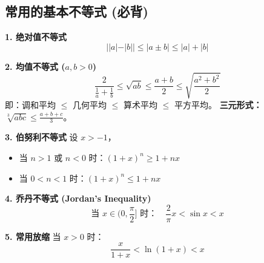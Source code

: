 \documentclass[a4paper,12pt]{ctexart}
\newenvironment{rednote}
  {\begin{tcolorbox}[colback=notepurple, colframe=highlightred, boxrule=1pt, title=\textbf{手写笔记/技巧补充}]}
  {\end{tcolorbox}}
\begin{document}
\subsection{常用的基本不等式 (必背)}

\begin{rednote}
\textbf{1. 绝对值不等式}
\[ ||a| - |b|| \le |a \pm b| \le |a| + |b| \]

\textbf{2. 均值不等式 ($a, b > 0$)}
\[ \frac{2}{\frac{1}{a} + \frac{1}{b}} \le \sqrt{ab} \le \frac{a+b}{2} \le \sqrt{\frac{a^2+b^2}{2}} \]
即：调和平均 $\le$ 几何平均 $\le$ 算术平均 $\le$ 平方平均。
\textbf{三元形式：} $\sqrt[3]{abc} \le \frac{a+b+c}{3}$。

\textbf{3. 伯努利不等式}
设 $x > -1$，
\begin{itemize}
    \item 当 $n > 1$ 或 $n < 0$ 时：$(1+x)^n \ge 1+nx$
    \item 当 $0 < n < 1$ 时：$(1+x)^n \le 1+nx$
\end{itemize}

\textbf{4. 乔丹不等式 (Jordan's Inequality)}
\[ \text{当 } x \in (0, \frac{\pi}{2}] \text{ 时：} \quad \frac{2}{\pi}x < \sin x < x \]

\textbf{5. 常用放缩}
当 $x > 0$ 时：
\[ \frac{x}{1+x} < \ln(1+x) < x \]
\end{rednote}
\end{document}
